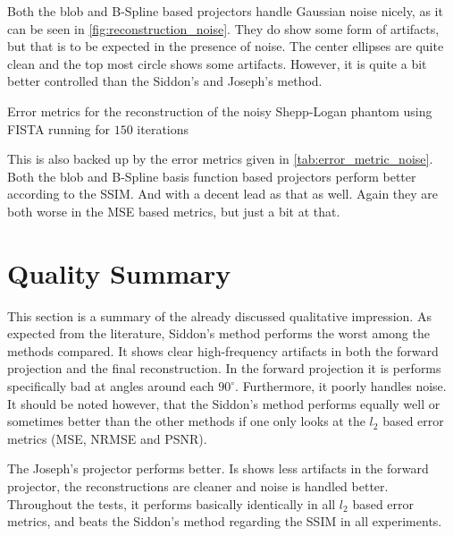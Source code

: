 Both the blob and B-Spline based projectors handle Gaussian noise nicely, as it can be seen in
\autoref{fig:reconstruction_noise}. They do show some form of artifacts, but that is to be expected
in the presence of noise. The center ellipses are quite clean and the top most circle shows some
artifacts. However, it is quite a bit better controlled than the Siddon's and Joseph's method.

\begin{table}[h]%
	\centering
	\caption{Error metrics for the reconstruction of the noisy Shepp-Logan phantom using FISTA
		running for \(150\) iterations}%
	\label{tab:error_metric_noise}
\end{table}

This is also backed up by the error metrics given in \autoref{tab:error_metric_noise}. Both the blob
and B-Spline basis function based projectors perform better according to the \gls{SSIM}. And with a
decent lead as that as well. Again they are both worse in the \gls{MSE} based metrics, but just a
bit at that.

\section{Quality Summary}\label{sec:experiments_quality_projection}

This section is a summary of the already discussed qualitative impression. As expected from the
literature, Siddon's method performs the worst among the methods compared. It shows clear
high-frequency artifacts in both the forward projection and the final reconstruction. In the forward
projection it is performs specifically bad at angles around each \(90^\circ\). Furthermore, it
poorly handles noise. It should be noted however, that the Siddon's method performs equally well or
sometimes better than the other methods if one only looks at the \(l_2\) based error metrics
(\gls{MSE}, \gls{NRMSE} and \gls{PSNR}).

The Joseph's projector performs better. Is shows less artifacts in the forward projector, the
reconstructions are cleaner and noise is handled better. Throughout the tests, it performs basically
identically in all \(l_2\) based error metrics, and beats the Siddon's method regarding the
\gls{SSIM} in all experiments.

